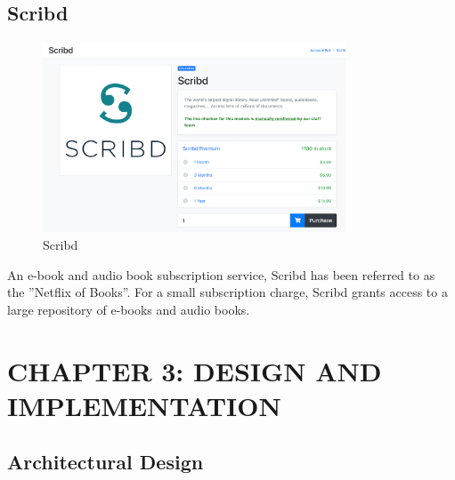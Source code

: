 \documentclass[12pt]{article}
\begin{document}
\subsection{Scribd}
\begin{figure}[h]
    \centerline{\includegraphics[width = 90mm]{scribd.png}}
    \caption{Scribd}
    \label{fig}
\end{figure}
An e-book and audio book subscription service, Scribd has been referred to as the 
”Netflix of Books”. For a small subscription charge, Scribd grants access to a 
large repository of e-books and audio books.
\clearpage

\section{CHAPTER 3: DESIGN AND IMPLEMENTATION}
\subsection{Architectural Design}
\end{document}
